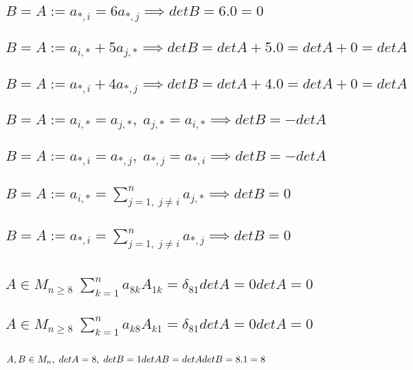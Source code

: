 \documentclass{article}
\begin{document}
    \subsection{\(B = A := a_{*,i} = 6a_{*,j} \implies detB = 6.0 = 0\)}
    \subsection{\(B = A := a_{i,*} + 5a_{j,*} \implies detB = detA + 5.0 = detA + 0 = detA\)}
    \subsection{\(B = A := a_{*,i} + 4a_{*,j} \implies detB = detA + 4.0 = detA + 0 = detA\)}
    \subsection{\(B = A := a_{i,*} = a_{j,*}, \; a_{j,*} = a_{i,*}  \implies detB = -detA\)}
    \subsection{\(B = A := a_{*,i} = a_{*,j}, \; a_{*,j} = a_{*,i}  \implies detB = -detA\)}
    \subsection{\(B = A := a_{i,*} = \sum_{j = 1, \; j \neq i}^n a_{j,*} \implies detB = 0\)}
    \subsection{\(B = A := a_{*,i} = \sum_{j = 1, \; j \neq i}^n a_{*,j} \implies detB = 0\)}
    \section{}
    \subsection{\(A \in M_{n \geq 8} \; \sum_{k = 1}^n a_{8k}A_{1k} = \delta_{81}detA = 0detA = 0\)}
    \subsection{\(A \in M_{n \geq 8} \; \sum_{k = 1}^n a_{k8}A_{k1} = \delta_{81}detA = 0detA = 0\)}
    \subsection{\(A, B \in M_n, \; detA = 8, \; detB = 1\\ detAB = detAdetB = 8.1 = 8\)}
\end{document}
